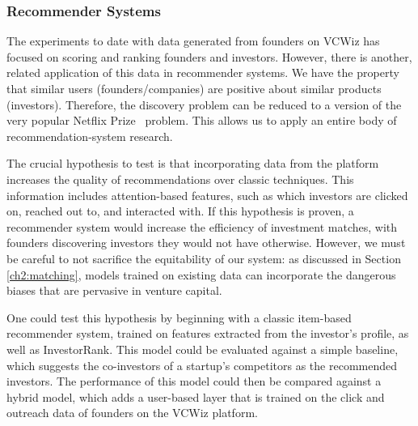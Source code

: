 \subsubsection{Recommender Systems}

The experiments to date with data generated from founders on VCWiz has focused on scoring and ranking founders and investors. However, there is another, related application of this data in recommender systems. We have the property that similar users (founders/companies) are positive about similar products (investors). Therefore, the discovery problem can be reduced to a version of the very popular Netflix Prize~\cite{netflixpize} problem. This allows us to apply an entire body of recommendation-system research.

The crucial hypothesis to test is that incorporating data from the platform increases the quality of recommendations over classic techniques. This information includes attention-based features, such as which investors are clicked on, reached out to, and interacted with. If this hypothesis is proven, a recommender system would increase the efficiency of investment matches, with founders discovering investors they would not have otherwise. However, we must be careful to not sacrifice the equitability of our system: as discussed in Section \ref{ch2:matching}, models trained on existing data can incorporate the dangerous biases that are pervasive in venture capital.

One could test this hypothesis by beginning with a classic item-based recommender system, trained on features extracted from the investor's profile, as well as InvestorRank. This model could be evaluated against a simple baseline, which suggests the co-investors of a startup's competitors as the recommended investors. The performance of this model could then be compared against a hybrid model, which adds a user-based layer that is trained on the click and outreach data of founders on the VCWiz platform.

